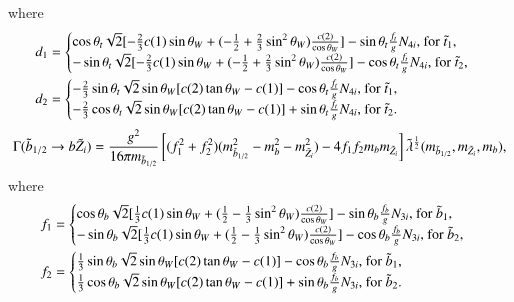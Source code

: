 \documentclass[final,3p,times,pdflatex]{elsarticle}
\begin{document}
where
\begin{align}
d_{1} &= \begin{cases} 
		\cos\theta_t \sqrt{2} [-{2 \over 3}c(1) \sin\theta_W + (-{1 \over 2} + {2 \over 3}\sin^2 \theta_W){c(2) \over \cos\theta_W}] - \sin\theta_t {f_t \over g} N_{4i} $, for $\tilde{t}_1$,$ \\
		-\sin\theta_t \sqrt{2} [-{2 \over 3}c(1) \sin\theta_W + (-{1 \over 2} + {2 \over 3}\sin^2 \theta_W){c(2) \over \cos\theta_W}] - \cos\theta_t {f_t \over g} N_{4i} $, for $\tilde{t}_2$,$ \\
		\end{cases} \\
d_{2} &= \begin{cases}
		-{2 \over 3} \sin\theta_t \sqrt{2} \sin\theta_W [c(2)\tan\theta_W - c(1)] - \cos\theta_t {f_t \over g}N_{4i} $, for $\tilde{t}_1 $,$\\
		-{2 \over 3} \cos\theta_t \sqrt{2} \sin\theta_W [c(2)\tan\theta_W - c(1)] + \sin\theta_t {f_t \over g}N_{4i}  $, for $\tilde{t}_2.\\
		\end{cases}
\end{align}
\begin{equation} \label{sbbneutNMSSM}
\Gamma(\tilde{b}_{1/2} \rightarrow b \tilde{Z}_i) = {g^2 \over 16 \pi m_{\tilde{b}_{1/2}}}\left[(f_{1}^2 + f_{2}^2)(m_{\tilde{b}_{1/2}}^2 - m_{b}^2 - m_{\tilde{Z}_i}^2) - 4f_{1}f_{2}m_{b}m_{\tilde{Z}_i}\right]\tilde{\lambda}^{1 \over 2}(m_{\tilde{b}_{1/2}},m_{\tilde{Z}_i},m_{b}),
\end{equation}
where
\begin{align}
f_{1} &= \begin{cases}
		\cos\theta_b \sqrt{2} [{1 \over 3}c(1) \sin\theta_W + ({1 \over 2} - {1 \over 3}\sin^2 \theta_W){c(2) \over \cos\theta_W}] - \sin\theta_b {f_b \over g} N_{3i} $, for $\tilde{b}_1$,$ \\
		-\sin\theta_b \sqrt{2} [{1 \over 3}c(1) \sin\theta_W + ({1 \over 2} - {1 \over 3}\sin^2 \theta_W){c(2) \over \cos\theta_W}] - \cos\theta_b {f_b \over g} N_{3i} $, for $\tilde{b}_2$,$ \\
		\end{cases} \\
f_{2} &= \begin{cases}
		{1 \over 3} \sin\theta_b \sqrt{2} \sin\theta_W [c(2)\tan\theta_W - c(1)] - \cos\theta_b {f_b \over g}N_{3i} $, for $\tilde{b}_1$,$ \\
		{1 \over 3} \cos\theta_b \sqrt{2} \sin\theta_W [c(2)\tan\theta_W - c(1)] + \sin\theta_b {f_b \over g}N_{3i}  $, for $\tilde{b}_2. \\
		\end{cases}
\end{align}
\end{document}
